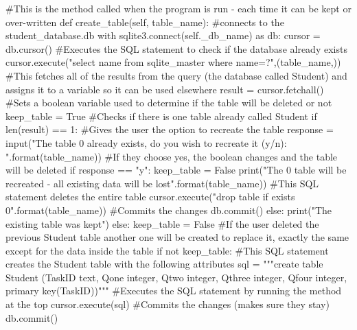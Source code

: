 \begin{landscape}
\begin{python}
    #This is the method called when the program is run - each time it can be kept or over-written
    def create_table(self, table_name):
        #connects to the student_database.db
        with sqlite3.connect(self._db_name) as db:
            cursor = db.cursor()
            #Executes the SQL statement to check if the database already exists
            cursor.execute("select name from sqlite_master where name=?",(table_name,))
            #This fetches all of the results from the query (the database called Student) and assigns it to a variable so it can be used elsewhere
            result = cursor.fetchall()
            #Sets a boolean variable used to determine if the table will be deleted or not
            keep_table = True
            #Checks if there is one table already called Student
            if len(result) == 1:
                #Gives the user the option to recreate the table
                response = input("The table {0} already exists, do you wish to recreate it (y/n): ".format(table_name))
                #If they choose yes, the boolean changes and the table will be deleted
                if response == "y":
                    keep_table = False
                    print("The {0} table will be recreated - all existing data will be lost".format(table_name))
                    #This SQL statement deletes the entire table
                    cursor.execute("drop table if exists {0}".format(table_name))
                    #Commits the changes
                    db.commit()
                else:
                    print("The existing table was kept")
            else:
                keep_table = False
            #If the user deleted the previous Student table another one will be created to replace it, exactly the same except for the data inside the table
            if not keep_table:
                #This SQL statement creates the Student table with the following attributes
                sql = """create table Student
                (TaskID text,
                Qone integer,
                Qtwo integer,
                Qthree integer,
                Qfour integer,
                primary key(TaskID))"""
                #Executes the SQL statement by running the method at the top
                cursor.execute(sql)
                #Commits the changes (makes sure they stay)
                db.commit()


\end{python}
\end{landscape}
